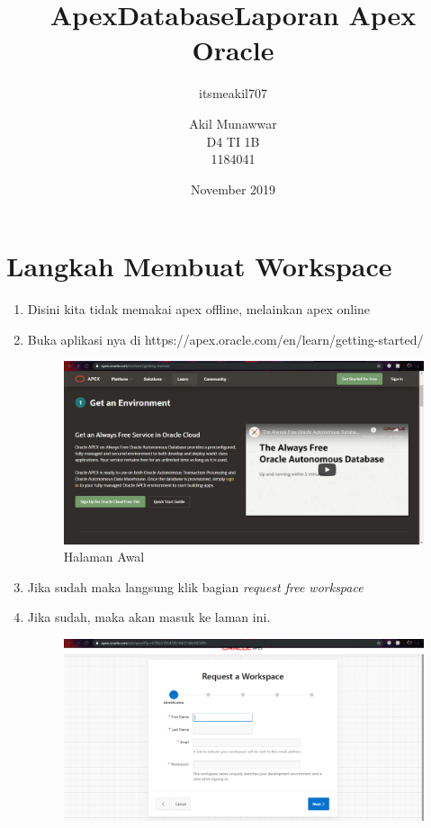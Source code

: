 \documentclass{article}
\title{ApexDatabase}
\author{itsmeakil707 }
\date{November 2019}
\begin{document}
\title{Laporan Apex Oracle}
\author{Akil Munawwar \\ D4 TI 1B \\ 1184041}
\maketitle

\section{Langkah Membuat Workspace}
\begin{enumerate}
    \item Disini kita tidak memakai apex offline, melainkan apex online
    \item Buka aplikasi nya di https://apex.oracle.com/en/learn/getting-started/
    \begin{figure}[!htbp]
        \centering
        \includegraphics[scale=0.3]{1.PNG}
        \caption{Halaman Awal}
    \end{figure}
    \item Jika sudah maka langsung klik bagian \textit{request free workspace}
\newpage
    \item Jika sudah, maka akan masuk ke laman ini.
    \begin{figure}[!htbp]
        \centering
        \includegraphics[scale=0.3]{2.PNG}

\end{figure}
\end{enumerate}
\end{document}

